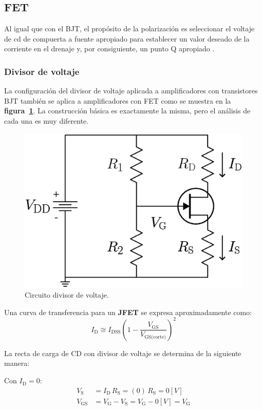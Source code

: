 \subsection{FET}
Al igual que con el BJT, el propósito de la polarización es seleccionar el
voltaje de cd de compuerta a fuente apropiado para establecer un valor deseado
de la corriente en el drenaje y, por consiguiente, un punto Q apropiado
\cite{Floyd}.

\subsubsection{Divisor de voltaje}
La configuración del divisor de voltaje aplicada a amplificadores con
transistores BJT también se aplica a amplificadores con FET como se muestra en
la \textbf{figura~\ref{figura14}}. La construcción básica es exactamente la misma,
pero el análisis de cada una es muy diferente.

\begin{figure}[!ht]
\centering
\includegraphics[scale=0.26]{diagramas/figura14.eps}
\caption{Circuito divisor de voltaje.}
\label{figura14}
\end{figure}

Una curva de transferencia para un \textbf{JFET} se expresa aproximadamente
como:
\begin{equation*}
    I_{\text{D}} \cong I_{\text{DSS}}
    \left(1-\frac{V_{\text{GS}}}{V_{\text{GS(corte)}}}\right)^2
\end{equation*}

La recta de carga de CD con divisor de voltaje se determina de la siguiente
manera:

Con $I_\text{D} = 0$:
\begin{equation*}
    \begin{split}
        V_\text{S} &= I_{\text{D}}\,R_{\text{S}}
                   = (0)\,R_{\text{S}}
                   = 0[V]\\
        V_\text{GS} &= V_{\text{G}} - V_{\text{S}}
                    = V_{\text{G}} - 0[V]
                    = V_{\text{G}}\\
    \end{split}
\end{equation*}

